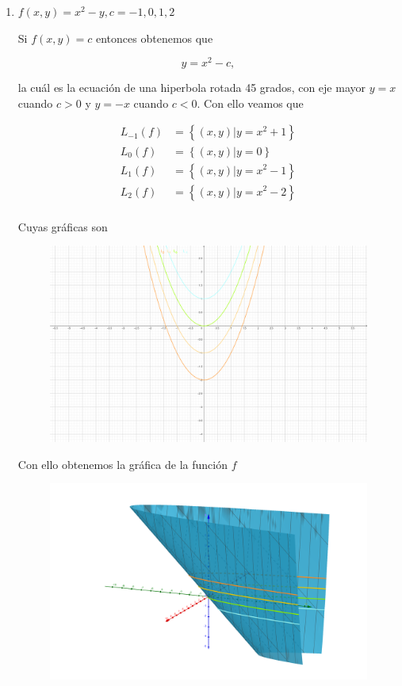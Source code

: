 \documentclass[letterpaper]{article}
\theoremstyle{definition}
\theoremstyle{lemathm}
\theoremstyle{lemathm}
\theoremstyle{lemathm}
\theoremstyle{lemademthm}
\newcommand{\set}[1]{\left \{ #1 \right\} }
\newcommand{\1}{\mathbbm{1}}
\begin{document}
\begin{enumerate}
\begin{enumerate}
			\newpage

			\item $f(x,y)=x^2-y, c=-1,0,1,2$
			
			Si $f(x,y)=c$ entonces obtenemos que

			\[y = x^2-c,\]

			la cuál es la ecuación de una hiperbola rotada 45 grados, con eje mayor $y=x$ cuando $c>0$ y $y=-x$ cuando $c < 0$. Con ello veamos que

			\begin{align*}
				L_{-1}(f) &= \set{(x,y) | y = x^2+1}\\
				L_{0}(f) &= \set{(x,y) | y = 0}\\
				L_{1}(f) &= \set{(x,y) | y = x^2-1}\\
				L_{2}(f) &= \set{(x,y) | y = x^2-2}\\
			\end{align*}

			Cuyas gráficas son

			\begin{figure}[h!]
				\includegraphics{Images/10.3.1.png}
				\centering
			\end{figure}

			Con ello obtenemos la gráfica de la función $f$

			\begin{figure}[h!]
				\includegraphics[scale=0.1]{Images/10.3.2.png}
				\centering
			\end{figure}


\end{enumerate}
\end{enumerate}
\end{document}
